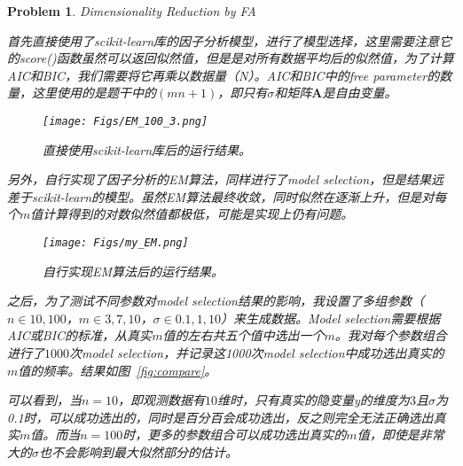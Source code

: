 \documentclass[UTF8]{article}
\makeatletter
\newtheorem{hw}{Problem}
\newenvironment{sol}
\renewcommand{\caption}[2][\relax]{%

			{\raggedright\textbf{\ALG@name~\thealgorithm} ##2\par}%

			\ifx\relax##1\relax %

			\addcontentsline{loa}{algorithm}{\protect\numberline{\thealgorithm}##2}%

			\else %

			\addcontentsline{loa}{algorithm}{\protect\numberline{\thealgorithm}##1}%

			\fi

			\kern2pt\hrule\kern2pt

		}
\newcommand{\Amat}{{\boldsymbol A}}
\makeatother
\begin{document}
\begin{hw}

	Dimensionality Reduction by FA

	

	\begin{sol}

		首先直接使用了scikit-learn库的因子分析模型，进行了模型选择，这里需要注意它的score()函数虽然可以返回似然值，但是是对所有数据平均后的似然值，为了计算AIC和BIC，我们需要将它再乘以数据量（N）。AIC和BIC中的free parameter的数量，这里使用的是题干中的$(mn+1)$，即只有$\sigma$和矩阵$\Amat$是自由变量。

		\begin{figure}

			\centering

			\texttt{[image: Figs/EM\_100\_3.png]}

			\vspace{-0.1cm}

			\caption{直接使用scikit-learn库后的运行结果。}

			\label{fig:EM}

		\end{figure}

		

		另外，自行实现了因子分析的EM算法，同样进行了model selection，但是结果远差于scikit-learn的模型。虽然EM算法最终收敛，同时似然在逐渐上升，但是对每个$m$值计算得到的对数似然值都极低，可能是实现上仍有问题。

		\begin{figure}

			\centering

			\texttt{[image: Figs/my\_EM.png]}

			\vspace{-0.1cm}

			\caption{自行实现EM算法后的运行结果。}

			\label{fig:my_EM}

		\end{figure}

		

		之后，为了测试不同参数对model selection结果的影响，我设置了多组参数（$n\in{10,100}$，$m\in{3,7,10}$，$\sigma\in{0.1,1,10}$）来生成数据。Model selection需要根据AIC或BIC的标准，从真实$m$值的左右共五个值中选出一个$m$。我对每个参数组合进行了$1000$次model selection，并记录这1000次model selection中成功选出真实的$m$值的频率。结果如图~\ref{fig:compare}。

		

		可以看到，当$n=10$，即观测数据有$10$维时，只有真实的隐变量y的维度为$3$且$\sigma$为0.1时，可以成功选出的，同时是百分百会成功选出，反之则完全无法正确选出真实$m$值。而当$n=100$时，更多的参数组合可以成功选出真实的$m$值，即使是非常大的$\sigma$也不会影响到最大似然部分的估计。


\end{sol}
\end{hw}
\end{document}
